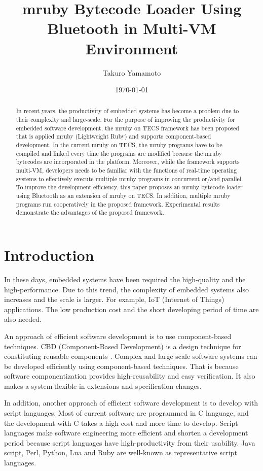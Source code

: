 \documentclass[conference,compsoc]{IEEEtran}
\title{mruby Bytecode Loader Using Bluetooth in Multi-VM Environment}
\author{Takuro Yamamoto}
\date{\today}
\begin{document}
\maketitle
\begin{abstract}
In recent years, the productivity of embedded systems has become a problem due to their complexity and large-scale.
For the purpose of improving the productivity for embedded software development, the mruby on TECS framework has been proposed that is applied mruby (Lightweight Ruby) and supports component-based development.
In the current mruby on TECS, the mruby programs have to be compiled and linked every time the programs are modified because the mruby bytecodes are incorporated in the platform.
Moreover, while the framework supports multi-VM, developers needs to be familiar with the functions of real-time operating systems to effectively execute multiple mruby programs in concurrent or/and parallel.
To improve the development efficiency, this paper proposes an mruby bytecode loader using Bluetooth as an extension of mruby on TECS.
In addition, multiple mruby programs run cooperatively in the proposed framework.
Experimental results demonstrate the advantages of the proposed framework.
\end{abstract}
\section{Introduction}
In these days, embedded systems have been required the high-quality and the high-performance.
Due to this trend, the complexity of embedded systems also increases and the scale is larger.
For example, IoT (Internet of Things) applications.
The low production cost and the short developing period of time are also needed.

An approach of efficient software development is to use component-based techniques.
CBD (Component-Based Development) is a design technique for constituting reusable components \cite{Crnkovic:2005:CSE:1062455.1062631}.
Complex and large scale software systems can be developed efficiently using component-based techniques.
That is because software componentization provides high-reusability and easy verification.
It also makes a system flexible in extensions and specification changes.

In addition, another approach of efficient software development is to develop with script languages.
Most of current software are programmed in C language, and the development with C takes a high cost and more time to develop.
Script languages make software engineering more efficient and shorten a development period because script languages have high-productivity from their usability.
Java script, Perl, Python, Lua and Ruby are well-known as representative script languages.
\end{document}
